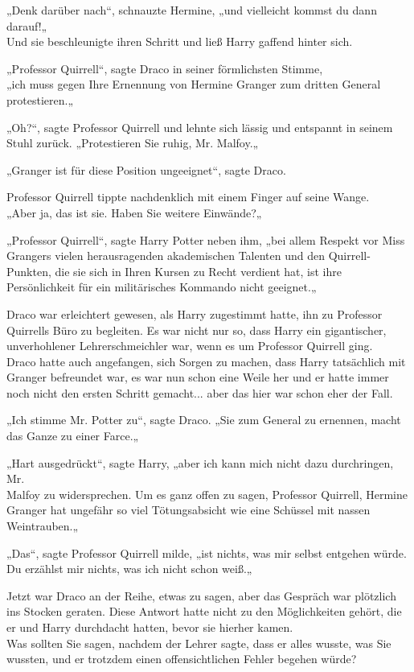 {„Denk darüber nach“, schnauzte Hermine, „und vielleicht kommst du dann darauf!„\\ Und sie beschleunigte ihren Schritt und ließ Harry gaffend hinter sich.

„Professor Quirrell“, sagte Draco in seiner förmlichsten Stimme,\\ „ich muss gegen Ihre Ernennung von Hermine Granger zum dritten General protestieren.„

„Oh?“, sagte Professor Quirrell und lehnte sich lässig und entspannt in seinem Stuhl zurück. „Protestieren Sie ruhig, Mr. Malfoy.„

„Granger ist für diese Position ungeeignet“, sagte Draco.

Professor Quirrell tippte nachdenklich mit einem Finger auf seine Wange.\\ „Aber ja, das ist sie. Haben Sie weitere Einwände?„

„Professor Quirrell“, sagte Harry Potter neben ihm, „bei allem Respekt vor Miss Grangers vielen herausragenden akademischen Talenten und den Quirrell-Punkten, die sie sich in Ihren Kursen zu Recht verdient hat, ist ihre Persönlichkeit für ein militärisches Kommando nicht geeignet.„

Draco war erleichtert gewesen, als Harry zugestimmt hatte, ihn zu Professor Quirrells Büro zu begleiten. Es war nicht nur so, dass Harry ein gigantischer, unverhohlener Lehrerschmeichler war, wenn es um Professor Quirrell ging.\\ Draco hatte auch angefangen, sich Sorgen zu machen, dass Harry tatsächlich mit Granger befreundet war, es war nun schon eine Weile her und er hatte immer noch nicht den ersten Schritt gemacht... aber das hier war schon eher der Fall.

„Ich stimme Mr. Potter zu“, sagte Draco. „Sie zum General zu ernennen, macht das Ganze zu einer Farce.„

„Hart ausgedrückt“, sagte Harry, „aber ich kann mich nicht dazu durchringen, Mr.\\ Malfoy zu widersprechen. Um es ganz offen zu sagen, Professor Quirrell, Hermine Granger hat ungefähr so viel Tötungsabsicht wie eine Schüssel mit nassen Weintrauben.„

„Das“, sagte Professor Quirrell milde, „ist nichts, was mir selbst entgehen würde.\\ Du erzählst mir nichts, was ich nicht schon weiß.„

Jetzt war Draco an der Reihe, etwas zu sagen, aber das Gespräch war plötzlich ins Stocken geraten. Diese Antwort hatte nicht zu den Möglichkeiten gehört, die er und Harry durchdacht hatten, bevor sie hierher kamen.\\ Was sollten Sie sagen, nachdem der Lehrer sagte, dass er alles wusste, was Sie wussten, und er trotzdem einen offensichtlichen Fehler begehen würde?

}
